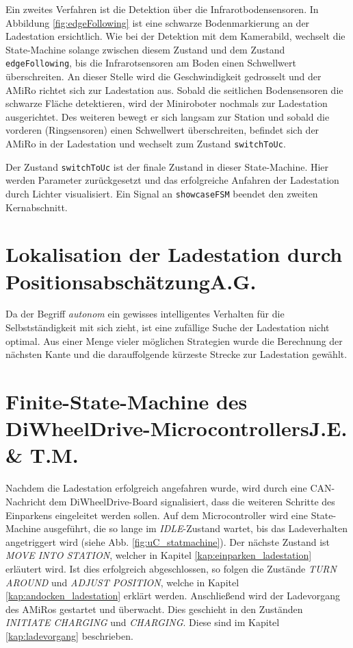 Ein zweites Verfahren ist die Detektion über die Infrarotbodensensoren. In Abbildung \ref{fig:edgeFollowing} ist eine schwarze Bodenmarkierung an der Ladestation ersichtlich. Wie bei der Detektion mit dem Kamerabild, wechselt die State-Machine solange zwischen diesem Zustand und dem Zustand \texttt{edgeFollowing}, bis die Infrarotsensoren am Boden einen Schwellwert überschreiten. An dieser Stelle wird die Geschwindigkeit gedrosselt und der AMiRo richtet sich zur Ladestation aus. Sobald die seitlichen Bodensensoren die schwarze Fläche detektieren, wird der Miniroboter nochmals zur Ladestation ausgerichtet. Des weiteren bewegt er sich langsam zur Station und sobald die vorderen (Ringsensoren) einen Schwellwert überschreiten, befindet sich der AMiRo in der Ladestation und wechselt zum Zustand \texttt{switchToUc}.

Der Zustand \texttt{switchToUc} ist der finale Zustand in dieser State-Machine. Hier werden Parameter zurückgesetzt und das erfolgreiche Anfahren der Ladestation durch Lichter visualisiert. Ein Signal an \texttt{showcaseFSM} beendet den zweiten Kernabschnitt.

\section[Lokalisation der Ladestation durch Positionsabschätzung]{Lokalisation der Ladestation durch Positionsabschätzung\hfill {\normalsize A.G.}} \label{cha:Lokalisation der Ladestation}
Da der Begriff \textit{autonom} ein gewisses intelligentes Verhalten für die Selbstständigkeit mit sich zieht, ist eine zufällige Suche der Ladestation nicht optimal. Aus einer Menge vieler möglichen Strategien wurde die Berechnung der nächsten Kante und die darauffolgende kürzeste Strecke zur Ladestation gewählt. 





\section[Finite-State-Machine des DiWheelDrive-Microcontrollers]{Finite-State-Machine des DiWheelDrive-Microcontrollers\hfill {\normalsize J.E. \& T.M.}} %

Nachdem die Ladestation erfolgreich angefahren wurde, wird durch eine CAN-Nachricht dem DiWheelDrive-Board signalisiert, dass die weiteren Schritte des Einparkens eingeleitet werden sollen.
Auf dem Microcontroller wird eine State-Machine ausgeführt, die so lange im \textit{IDLE}-Zustand wartet, bis das Ladeverhalten angetriggert wird (siehe Abb. \ref{fig:uC_statmachine}).
Der nächste Zustand ist \textit{MOVE INTO STATION}, welcher in Kapitel \ref{kap:einparken_ladestation} erläutert wird. Ist dies erfolgreich abgeschlossen, so folgen die Zustände \textit{TURN AROUND} und \textit{ADJUST POSITION}, welche in Kapitel \ref{kap:andocken_ladestation} erklärt werden. Anschließend wird der Ladevorgang des AMiRos gestartet und überwacht. Dies geschieht in den Zuständen \textit{INITIATE CHARGING} und \textit{CHARGING}. Diese sind im Kapitel \ref{kap:ladevorgang} beschrieben.

